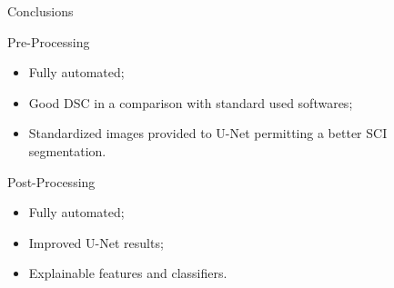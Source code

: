 \documentclass[]{standalone}
\begin{document}
	\begin{frame}{Conclusions}{}
	
	\begin{block}{Pre-Processing}
	\begin{itemize}
		\item Fully automated;
		\item Good DSC in a comparison with standard used softwares;
		\item Standardized images provided to U-Net permitting a better SCI segmentation.
	\end{itemize}
	\end{block}
	
	\begin{exampleblock}{Post-Processing}
	\begin{itemize}
		\item Fully automated;
		\item Improved U-Net results;
		\item Explainable features and classifiers.
	\end{itemize}
	\end{exampleblock}
	
	
	\end{frame}
\end{document}
